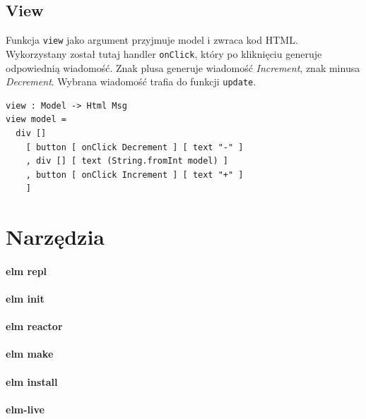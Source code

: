 \documentclass[twoside,a4paper]{report}
\begin{document}
\subsection{View}
Funkcja \verb|view| jako argument przyjmuje model i zwraca kod HTML\@.
Wykorzystany został tutaj handler \verb|onClick|, który po kliknięciu generuje odpowiednią wiadomość.
Znak plusa generuje wiadomość \textit{Increment}, znak minusa \textit{Decrement}.
Wybrana wiadomość trafia do funkcji \verb|update|.

\lstset{frame=single}
\begin{lstlisting}[caption={\textit{The Elm Architecture} - View},label=kod:View]
view : Model -> Html Msg
view model =
  div []
    [ button [ onClick Decrement ] [ text "-" ]
    , div [] [ text (String.fromInt model) ]
    , button [ onClick Increment ] [ text "+" ]
    ]
\end{lstlisting}

\section{Narzędzia}

\paragraph{elm repl}

\paragraph{elm init}

\paragraph{elm reactor}

\paragraph{elm make}

\paragraph{elm install}

\paragraph{elm-live}\cite{elm-live}


\end{document}

